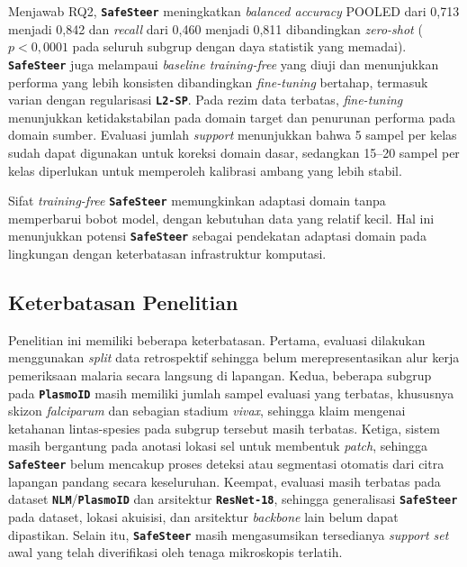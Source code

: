 \documentclass[conference]{IEEEtran}
\newcommand{\nama}[1]{\textbf{\texttt{#1}}}
\begin{document}
Menjawab RQ2, \nama{SafeSteer} meningkatkan \textit{balanced accuracy} POOLED dari 0,713 menjadi 0,842 dan \textit{recall} dari 0,460 menjadi 0,811 dibandingkan \textit{zero-shot} ($p<0{,}0001$ pada seluruh subgrup dengan daya statistik yang memadai). \nama{SafeSteer} juga melampaui \textit{baseline training-free} yang diuji dan menunjukkan performa yang lebih konsisten dibandingkan \textit{fine-tuning} bertahap, termasuk varian dengan regularisasi \nama{L2-SP}. Pada rezim data terbatas, \textit{fine-tuning} menunjukkan ketidakstabilan pada domain target dan penurunan performa pada domain sumber. Evaluasi jumlah \textit{support} menunjukkan bahwa 5 sampel per kelas sudah dapat digunakan untuk koreksi domain dasar, sedangkan 15--20 sampel per kelas diperlukan untuk memperoleh kalibrasi ambang yang lebih stabil.

Sifat \textit{training-free} \nama{SafeSteer} memungkinkan adaptasi domain tanpa memperbarui bobot model, dengan kebutuhan data yang relatif kecil. Hal ini menunjukkan potensi \nama{SafeSteer} sebagai pendekatan adaptasi domain pada lingkungan dengan keterbatasan infrastruktur komputasi.

\subsection{Keterbatasan Penelitian}
Penelitian ini memiliki beberapa keterbatasan. Pertama, evaluasi dilakukan menggunakan \textit{split} data retrospektif sehingga belum merepresentasikan alur kerja pemeriksaan malaria secara langsung di lapangan. Kedua, beberapa subgrup pada \nama{PlasmoID} masih memiliki jumlah sampel evaluasi yang terbatas, khususnya skizon \textit{falciparum} dan sebagian stadium \textit{vivax}, sehingga klaim mengenai ketahanan lintas-spesies pada subgrup tersebut masih terbatas. Ketiga, sistem masih bergantung pada anotasi lokasi sel untuk membentuk \textit{patch}, sehingga \nama{SafeSteer} belum mencakup proses deteksi atau segmentasi otomatis dari citra lapangan pandang secara keseluruhan. Keempat, evaluasi masih terbatas pada dataset \nama{NLM}/\nama{PlasmoID} dan arsitektur \nama{ResNet-18}, sehingga generalisasi \nama{SafeSteer} pada dataset, lokasi akuisisi, dan arsitektur \textit{backbone} lain belum dapat dipastikan. Selain itu, \nama{SafeSteer} masih mengasumsikan tersedianya \textit{support set} awal yang telah diverifikasi oleh tenaga mikroskopis terlatih.
\end{document}

